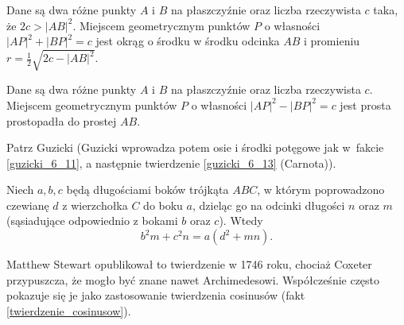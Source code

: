 \begin{proposition}
    Dane są dwa różne punkty $A$ i $B$ na płaszczyźnie oraz liczba rzeczywista $c$ taka, że $2c > |AB|^2$.
    Miejscem geometrycznym punktów $P$ o własności $|AP|^2 + |BP|^2 = c$ jest okrąg o środku w środku odcinka $AB$ i promieniu $r = \frac 1 2 \sqrt{2c - |AB|^2}$.
\end{proposition}

\begin{proposition}
    Dane są dwa różne punkty $A$ i $B$ na płaszczyźnie oraz liczba rzeczywista $c$.
    Miejscem geometrycznym punktów $P$ o własności $|AP|^2 - |BP|^2 = c$ jest prosta prostopadła do prostej $AB$.
\end{proposition}

Patrz Guzicki \cite[s. 170-173]{guzicki_2021} (Guzicki wprowadza potem osie i środki potęgowe jak w~fakcie \ref{guzicki_6_11}, a następnie twierdzenie \ref{guzicki_6_13} (Carnota)).


\begin{theorem}[Stewarta, 1746]
	Niech $a, b, c$ będą długościami boków trójkąta $ABC$, w którym poprowadzono czewianę $d$ z wierzchołka $C$ do boku $a$, dzieląc go na odcinki długości $n$ oraz $m$ (sąsiadujące odpowiednio z bokami $b$ oraz $c$).
	Wtedy
	\begin{equation}
		b^2 m + c^2 n = a (d^2 + mn).
	\end{equation}
\end{theorem}

Matthew Stewart opublikował to twierdzenie w 1746 roku, chociaż Coxeter przypuszcza, że mogło być znane nawet Archimedesowi.
Współcześnie często pokazuje się je jako zastosowanie twierdzenia cosinusów (fakt \ref{twierdzenie_cosinusow}).

%
